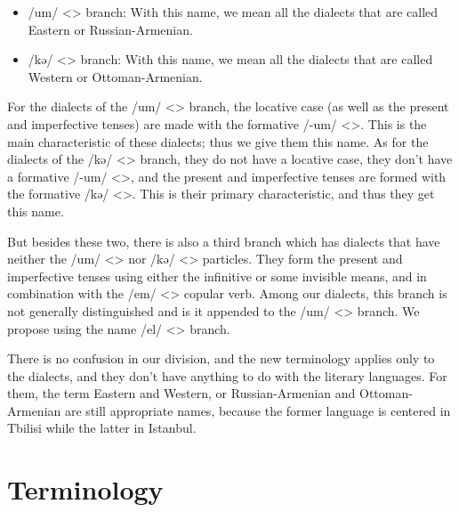\begin{adjarianpage}\label{page:35}\end{adjarianpage}%

\begin{itemize}
	\item /um/ <> branch: With this name, we mean all the dialects that are called Eastern or Russian-Armenian.
	\item /kə/ <> branch: With this name, we mean all the dialects that are called Western or Ottoman-Armenian.
	
\end{itemize}

For the dialects of the /um/ <> branch, the locative case   (as well as the present and imperfective tenses) are made with the formative /-um/ <>. This is the main characteristic of these dialects; thus we give them this name. As for the dialects of the /kə/ <> branch, they do not have a locative case, they don't have a formative /-um/ <>, and the present and imperfective tenses are formed with the formative /kə/ <>. This is their primary characteristic, and thus they get this name. 

But besides these two, there is also a third branch which has dialects that have neither the /um/ <> nor /kə/ <> particles. They form the present and imperfective tenses using either the infinitive or some invisible means, and in combination with the /em/ <> copular verb. Among our dialects, this branch is not generally distinguished and is it appended to the /um/ <> branch. We propose using the name /el/ <> branch. 

There is no confusion in our division, and the new terminology applies only to the dialects, and they don't have anything to do with the literary languages. For them, the term Eastern and Western, or Russian-Armenian and Ottoman-Armenian are still appropriate names, because the former language is centered in Tbilisi while the latter in Istanbul. 


\begin{adjarianpage}\label{page:36}\end{adjarianpage}%

\section{Terminology}

